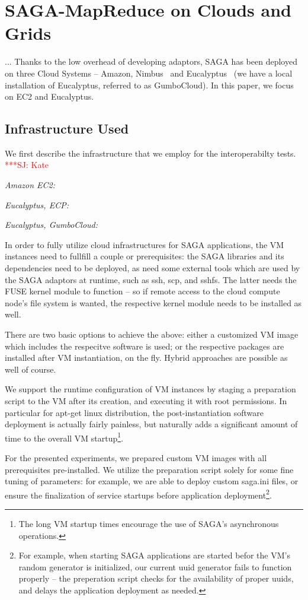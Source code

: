 \documentclass[conference,final]{IEEEtran}
\newcommand{\jhanote}[1]{ {\textcolor{red} { ***SJ: #1 }}}
\newcommand{\jhanote}[1]{}
\begin{document}
\section{SAGA-MapReduce on Clouds and Grids}

... Thanks to the low overhead of developing adaptors, SAGA has been
deployed on three Cloud Systems -- Amazon, Nimbus~\cite{nimbus} and
Eucalyptus~\cite{eucalyptus} (we have a local installation of
Eucalyptus, referred to as GumboCloud).  In this paper, we focus on
EC2 and Eucalyptus.


\subsection*{Infrastructure Used} We first describe the infrastructure
that we employ for the interoperabilty tests.  \jhanote{Kate}

{\it Amazon EC2:}

{\it Eucalyptus, ECP:}

{\it Eucalyptus, GumboCloud:}


 In order to fully utilize cloud infrastructures for SAGA
 applications, the VM instances need to fullfill a couple or
 prerequisites: the SAGA libraries and its dependencies need to be
 deployed, as need some external tools which are used by the SAGA
 adaptors at runtime, such as ssh, scp, and sshfs.  The latter needs
 the FUSE kernel module to function -- so if remote access to the
 cloud compute node's file system is wanted, the respective kernel
 module needs to be installed as well.

 There are two basic options to achieve the above:  either a
 customized VM image which includes the respecitve software is used;
 or the respective packages are installed after VM instantiation, on
 the fly.  Hybrid approaches are possible as well of course.

 We support the runtime configuration of VM instances by staging a
 preparation script to the VM after its creation, and executing it
 with root permissions.  In particular for apt-get linux distribution,
 the post-instantiation software deployment is actually fairly
 painless, but naturally adds a significant amount of time to the
 overall VM startup\footnote{The long VM startup times encourage the
 use of SAGA's asynchronous operations.}.

 For the presented experiments, we prepared custom VM images with all
 prerequisites pre-installed.  We utilize the preparation script
 solely for some fine tuning of parameters: for example, we are able
 to deploy custom saga.ini files, or ensure the finalization of
 service startups before application deployment\footnote{For example,
 when starting SAGA applications are started befor the VM's random
 generator is initialized, our current uuid generator fails to
 function properly -- the preperation script checks for the
 availability of proper uuids, and delays the application deployment
 as needed.}.
\end{document}
